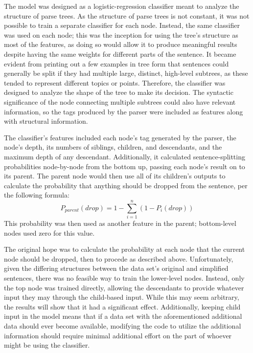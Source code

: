 \documentclass{article}
\begin{document}
The model was designed as a logistic-regression classifier meant to analyze the structure of parse trees. As the structure of parse trees is not constant, it was not possible to train a separate classifier for each node. Instead, the same classifier was used on each node; this was the inception for using the tree's structure as most of the features, as doing so would allow it to produce meaningful results despite having the same weights for different parts of the sentence. It became evident from printing out a few examples in tree form that sentences could generally be split if they had multiple large, distinct, high-level subtrees, as these tended to represent different topics or points. Therefore, the classifier was designed to analyze the shape of the tree to make its decision. The syntactic significance of the node connecting multiple subtrees could also have relevant information, so the tags produced by the parser were included as features along with structural information.

The classifier's features included each node's tag generated by the parser, the node's depth, its numbers of siblings, children, and descendants, and the maximum depth of any descendant. Additionally, it calculated sentence-splitting probabilities node-by-node from the bottom up, passing each node's result on to its parent. The parent node would then use all of its children's outputs to calculate the probability that anything should be dropped from the sentence, per the following formula:
\[P_{parent}(drop) = 1 - \sum_{i=1}^{n}\left(1 - P_{i}(drop)\right)\]
This probability was then used as another feature in the parent; bottom-level nodes used zero for this value.

The original hope was to calculate the probability at each node that the current node should be dropped, then to procede as described above. Unfortunately, given the differing structures between the data set's original and simplified sentences, there was no feasible way to train the lower-level nodes. Instead, only the top node was trained directly, allowing the descendants to provide whatever input they may through the child-based input. While this may seem arbitrary, the results will show that it had a significant effect. Additionally, keeping child input in the model means that if a data set with the aforementioned additional data should ever become available, modifying the code to utilize the additional information should require minimal additional effort on the part of whoever might be using the classifier.
\end{document}
